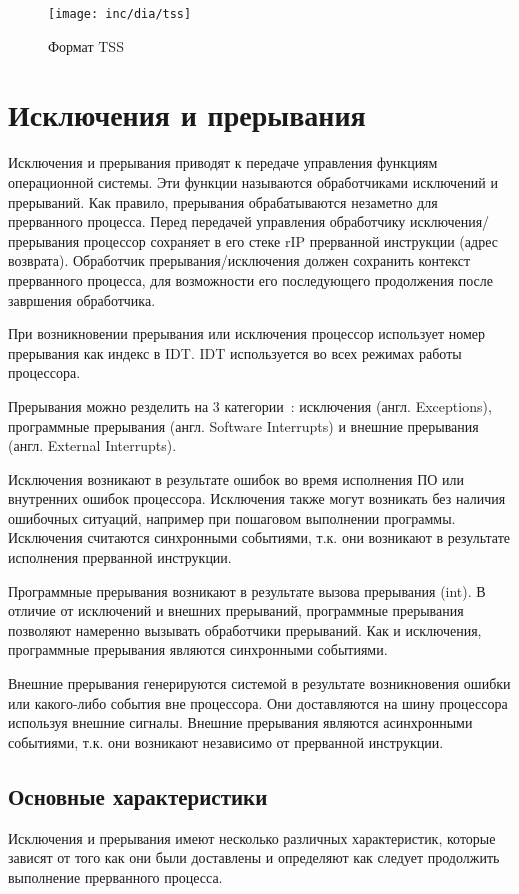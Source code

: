 \begin{figure}[ht!]
  \centering
  \texttt{[image: inc/dia/tss]}
  \caption{Формат TSS}
  \label{fig:tss}
\end{figure}



\section{Исключения и прерывания}
\label{sec:exceptions_and_interrupts}

Исключения и прерывания приводят к передаче управления функциям операционной
системы. Эти функции называются обработчиками исключений и прерываний.
Как правило, прерывания обрабатываются незаметно для прерванного
процесса. Перед передачей управления обработчику исключения/прерывания
процессор сохраняет в его стеке rIP прерванной инструкции (адрес возврата).
Обработчик прерывания/исключения должен сохранить контекст прерванного процесса,
для возможности его последующего продолжения после завршения обработчика.

При возникновении прерывания или исключения процессор использует номер
прерывания как индекс в IDT. IDT используется во всех режимах работы процессора.

Прерывания можно резделить на 3 категории~\cite{amd_pm_v2}: исключения (англ. Exceptions),
программные прерывания (англ. Software Interrupts) и внешние прерывания (англ. External Interrupts).

Исключения возникают в результате ошибок во время исполнения ПО или внутренних
ошибок процессора. Исключения также могут возникать без наличия ошибочных
ситуаций, например при пошаговом выполнении программы. Исключения считаются
синхронными событиями, т.к. они возникают в результате исполнения прерванной
инструкции.

Программные прерывания возникают в результате вызова прерывания (int). В
отличие от исключений и внешних прерываний, программные прерывания позволяют
намеренно вызывать обработчики прерываний. Как и исключения, программные
прерывания являются синхронными событиями.

Внешние прерывания генерируются системой в результате возникновения ошибки
или какого-либо события вне процессора. Они доставляются на шину процессора
используя внешние сигналы. Внешние прерывания являются асинхронными событиями,
т.к. они возникают независимо от прерванной инструкции.

\subsection{Основные характеристики}
Исключения и прерывания имеют несколько различных характеристик, которые
зависят от того как они были доставлены и определяют как следует продолжить выполнение
прерванного процесса.

